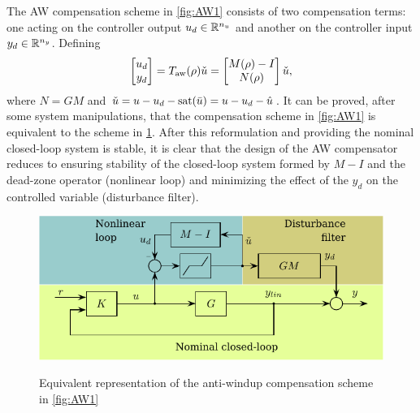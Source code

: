 \documentclass[fleqn,11pt]{article}
\begin{document}
The AW compensation scheme in \cref{fig:AW1} consists of two compensation terms: one acting on the controller output $u_d\in\mathbb{R}^{n_u}$ and another on the controller input $y_d\in\mathbb{R}^{n_y}$. Defining
\begin{equation*}
    \begin{bmatrix} u_d \\ y_d \end{bmatrix} =
    T_{\mathrm{aw}}(\rho)\check{u}
     = \begin{bmatrix} M(\rho)-I \\ N(\rho) \end{bmatrix}\check{u},
\end{equation*}
where $N=G M$ and $\check{u} = u - u_d - \mathrm{sat}(\bar{u}) = u - u_d - \hat{u}$. It can be proved, after some system manipulations, that the compensation scheme in \cref{fig:AW1} is equivalent to the scheme in \cref{fig:AW2}. After this reformulation and providing the nominal closed-loop system is stable, it is clear that the design of the AW compensator reduces to ensuring stability of the closed-loop system formed by $M-I$ and the dead-zone operator (nonlinear loop) and minimizing the effect of the $y_d$ on the controlled variable (disturbance filter).

\begin{figure}
    \centering
    \includegraphics{figs/fig_sch_AWcomp_2}\\
    \caption{Equivalent representation of the anti-windup compensation scheme in \cref{fig:AW1}}\label{fig:AW2}
\end{figure}
\end{document}
